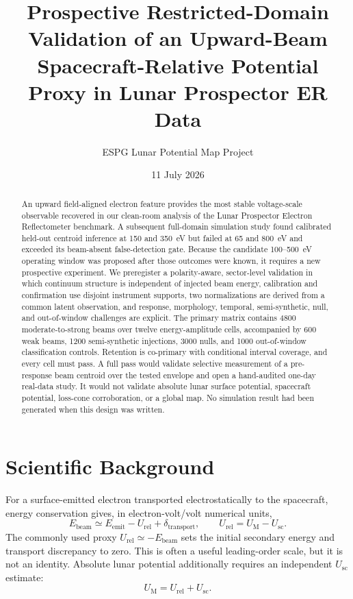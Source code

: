 \documentclass[11pt]{article}
\title{Prospective Restricted-Domain Validation of an Upward-Beam\\
Spacecraft-Relative Potential Proxy in Lunar Prospector ER Data}
\author{ESPG Lunar Potential Map Project}
\date{11 July 2026}
\newcommand{\UM}{U_{\mathrm{M}}}
\newcommand{\Usc}{U_{\mathrm{sc}}}
\newcommand{\Urel}{U_{\mathrm{rel}}}
\newcommand{\Ebeam}{E_{\mathrm{beam}}}
\newcommand{\Eemit}{E_{\mathrm{emit}}}
\begin{document}
\maketitle

\begin{abstract}
An upward field-aligned electron feature provides the most stable voltage-scale
observable recovered in our clean-room analysis of the Lunar Prospector
Electron Reflectometer benchmark.  A subsequent full-domain simulation study
found calibrated held-out centroid inference at 150 and 350~eV but failed at
65 and 800~eV and exceeded its beam-absent false-detection gate.  Because the
candidate 100--500~eV operating window was proposed after those outcomes were
known, it requires a new prospective experiment.  We preregister a
polarity-aware, sector-level validation in which continuum structure is
independent of injected beam energy, calibration and confirmation use disjoint
instrument supports, two normalizations are derived from a common latent
observation, and response, morphology, temporal, semi-synthetic, null, and
out-of-window challenges are explicit.  The primary matrix contains 4800
moderate-to-strong beams over twelve energy-amplitude cells, accompanied by 600
weak beams, 1200 semi-synthetic injections, 3000 nulls, and 1000 out-of-window
classification controls.  Retention is co-primary with conditional interval
coverage, and every cell must pass.  A full pass would validate selective
measurement of a pre-response beam centroid over the tested envelope and open
a hand-audited one-day real-data study.  It would not validate absolute lunar
surface potential, spacecraft potential, loss-cone corroboration, or a global
map.  No simulation result had been generated when this design was written.
\end{abstract}

\section{Scientific Background}

For a surface-emitted electron transported electrostatically to the spacecraft,
energy conservation gives, in electron-volt/volt numerical units,
\begin{equation}
  \Ebeam \simeq \Eemit-\Urel+\delta_{\mathrm{transport}},
  \qquad \Urel=\UM-\Usc.
  \label{eq:beam}
\end{equation}
The commonly used proxy $\Urel\simeq-\Ebeam$ sets the initial secondary energy
and transport discrepancy to zero.  This is often a useful leading-order
scale, but it is not an identity.  Absolute lunar potential additionally
requires an independent $\Usc$ estimate:
\begin{equation}
  \UM=\Urel+\Usc.
\end{equation}
\end{document}

